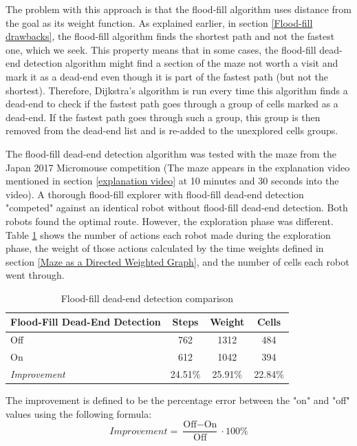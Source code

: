 \documentclass[12pt]{article}
\begin{document}
The problem with this approach is that the flood-fill algorithm uses distance from the goal as its weight function.
As explained earlier, in section \ref{Flood-fill drawbacks}, the flood-fill algorithm finds the shortest path and not the fastest one, which we seek.
This property means that in some cases, the flood-fill dead-end detection algorithm might find a section of the \gls{maze} not worth a visit and mark it as a dead-end even though it is part of the fastest path (but not the shortest).
Therefore, Dijkstra's algorithm is run every time this algorithm finds a dead-end to check if the fastest path goes through a group of \gls{cell}s marked as a dead-end.
If the fastest path goes through such a group, this group is then removed from the dead-end list and is re-added to the unexplored \gls{cell}s groups.

The flood-fill dead-end detection algorithm was tested with the \gls{maze} from the Japan 2017 \gls{Micromouse} competition (The \gls{maze} appears in the explanation video mentioned in section \ref{explanation video} at 10 minutes and 30 seconds into the video).
A thorough flood-fill explorer with flood-fill dead-end detection "competed" against an identical robot without flood-fill dead-end detection.
Both robots found the optimal route.
However, the exploration phase was different.
Table \ref{flood-fill dead-end detection table} shows the number of actions each robot made during the exploration phase, the weight of those actions calculated by the time weights defined in section \ref{Maze as a Directed Weighted Graph}, and the number of \gls{cell}s each robot went through.

\begin{table}[H]
    \centering
    \begin{tabular}{ | l | c | c | c | }
    \hline
        Flood-Fill Dead-End Detection & Steps & Weight & Cells \\
    \hline
         Off & 762 & 1312 & 484 \\
    \hline
         On & 612 & 1042 & 394 \\
    \hline
         \textit{Improvement} & 24.51\% & 25.91\% & 22.84\% \\
    \hline
    \end{tabular}
    \caption{Flood-fill dead-end detection comparison}
    \label{flood-fill dead-end detection table}
\end{table}

The improvement is defined to be the percentage error between the "on" and "off" values using the following formula:
$$Improvement = \frac{\textrm{Off}-\textrm{On}}{\textrm{Off}} \cdot 100\%$$
\end{document}
